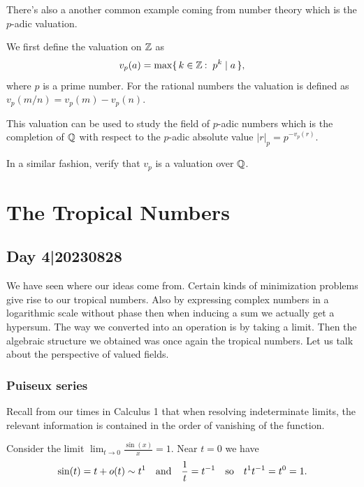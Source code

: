 \documentclass[12pt]{memoir}
\begin{document}
There's also a another common example coming from number theory which is the $p$-adic valuation. 

\begin{Ex}
    We first define the valuation on $\mathbb{Z}$ as 
    $$v_p(a)=\max\set{k\in\bZ\:\ p^k\mid a},$$
    where $p$ is a prime number. For the rational numbers the valuation is defined as $v_p(m/n)=v_p(m)-v_p(n)$.
\end{Ex}

This valuation can be used to study the field of $p$-adic numbers which is the completion of $\mathbb{Q}$ with respect to the $p$-adic absolute value $|r|_p=p^{-v_p(r)}$.

\begin{Ej}
In a similar fashion, verify that $v_p$ is a valuation over $\mathbb{Q}$.
\end{Ej}

\chapter{The Tropical Numbers}

\section{Day 4|20230828}

We have seen where our ideas come from. Certain kinds of minimization problems give rise to our tropical numbers. Also by expressing complex numbers in a logarithmic scale without phase then when inducing a sum we actually get a hypersum. The way we converted into an operation is by taking a limit. Then the algebraic structure we obtained was once again the tropical numbers. Let us talk about the perspective of valued fields.
\subsection{Puiseux series}
Recall from our times in Calculus 1 that when resolving indeterminate limits, the relevant information is contained in the order of vanishing of the function.

\begin{Ex}
    Consider the limit $\lim_{t\to 0}\frac{\sin(x)}{x}=1$. Near $t=0$ we have 
    $$\sin(t)=t+o(t)\sim t^1\quad\text{and}\quad\frac{1}{t}=t^{-1}\quad\text{so}\quad t^1t^{-1}=t^0=1.$$
\end{Ex}
\end{document}
